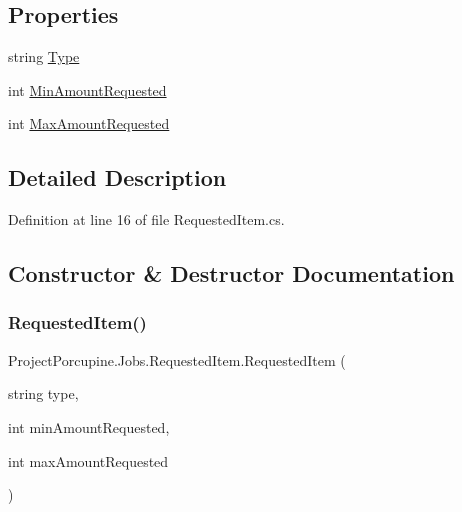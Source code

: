\subsection*{Properties}
\begin{DoxyCompactItemize}
\item 
string \hyperlink{class_project_porcupine_1_1_jobs_1_1_requested_item_a0bf2e8304b2300a94733dd8849cfc18f}{Type}
\item 
int \hyperlink{class_project_porcupine_1_1_jobs_1_1_requested_item_a2903d0004c22e2b46b42286658910908}{Min\+Amount\+Requested}
\item 
int \hyperlink{class_project_porcupine_1_1_jobs_1_1_requested_item_a9e5f5cee2668067f2e6c3fa90cd6432e}{Max\+Amount\+Requested}
\end{DoxyCompactItemize}


\subsection{Detailed Description}


Definition at line 16 of file Requested\+Item.\+cs.



\subsection{Constructor \& Destructor Documentation}
\mbox{\label{class_project_porcupine_1_1_jobs_1_1_requested_item_a2449ad734128bb370678af6f0097cf53}} 
\subsubsection{\texorpdfstring{Requested\+Item()}{RequestedItem()}\hspace{0.1cm}{\footnotesize\ttfamily [1/4]}}
{\footnotesize\ttfamily Project\+Porcupine.\+Jobs.\+Requested\+Item.\+Requested\+Item (\begin{DoxyParamCaption}\item[{string}]{type,  }\item[{int}]{min\+Amount\+Requested,  }\item[{int}]{max\+Amount\+Requested }\end{DoxyParamCaption})}



